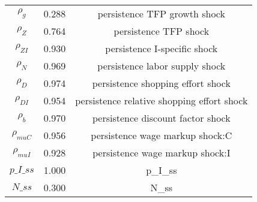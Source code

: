 \begin{center}
\begin{longtable}{ccc}
${\rho_g}$ 	 & 	 0.288 	 & 	 persistence TFP growth shock\\
${\rho_Z}$ 	 & 	 0.764 	 & 	 persistence TFP shock\\
${\rho_{ZI}}$ 	 & 	 0.930 	 & 	 persistence I-specific shock\\
${\rho_N}$ 	 & 	 0.969 	 & 	 persistence labor supply shock\\
${\rho_D}$ 	 & 	 0.974 	 & 	 persistence shopping effort shock\\
${\rho_{DI}}$ 	 & 	 0.954 	 & 	 persistence relative shopping effort shock\\
${\rho_b}$ 	 & 	 0.970 	 & 	 persistence discount factor shock\\
${\rho_{muC}}$ 	 & 	 0.956 	 & 	 persistence wage markup shock:C\\
${\rho_{muI}}$ 	 & 	 0.928 	 & 	 persistence wage markup shock:I\\
$p\_I\_ss$ 	 & 	 1.000 	 & 	 p\_I\_ss\\
$N\_ss$ 	 & 	 0.300 	 & 	 N\_ss\\
\bottomrule%
\end{longtable}
\end{center}
